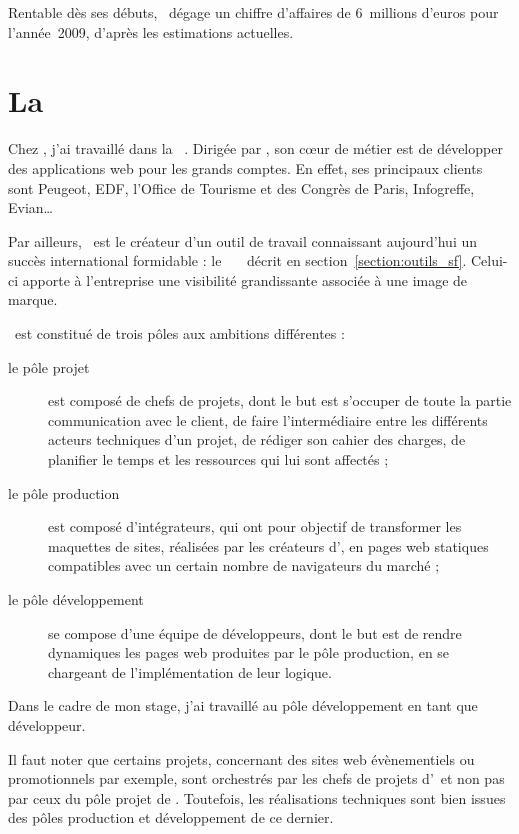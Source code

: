 Rentable dès ses débuts, \asensio\ dégage un chiffre d'affaires de 6~millions d'euros pour l'année~2009, d'après les estimations actuelles.


\section{La \abufull\ \asl}

Chez \asensio, j'ai travaillé dans la \abufull\ \asl. Dirigée par \apotencier, son cœur de métier est de développer des applications web pour les grands comptes. En effet, ses principaux clients sont Peugeot, EDF, l'Office de Tourisme et des Congrès de Paris, Infogreffe, Evian\dots

Par ailleurs, \asl\ est le créateur d'un outil de travail connaissant aujourd'hui un succès international formidable : le \afm\ \aphp\ \asf\ décrit en section~\ref{section:outils_sf}. Celui-ci apporte à l'entreprise une visibilité grandissante associée à une image de marque. 

\asl\ est constitué de trois pôles aux ambitions différentes :

\begin{description}
	\item[le pôle projet] est composé de chefs de projets, dont le but est s'occuper de toute la partie communication avec le client, de faire l'intermédiaire entre les différents acteurs techniques d'un projet, de rédiger son cahier des charges, de planifier le temps et les ressources qui lui sont affectés ;
	\item[le pôle production] est composé d'intégrateurs, qui ont pour objectif de transformer les maquettes de sites, réalisées par les créateurs d'\aes, en pages web statiques compatibles avec un certain nombre de navigateurs du marché ;
	\item[le pôle développement] se compose d'une équipe de développeurs, dont le but est de rendre dynamiques les pages web produites par le pôle production, en se chargeant de l'implémentation de leur logique.
\end{description}

Dans le cadre de mon stage, j'ai travaillé au pôle développement en tant que développeur.

Il faut noter que certains projets, concernant des sites web évènementiels ou promotionnels par exemple, sont orchestrés par les chefs de projets d'\aes\ et non pas par ceux du pôle projet de \asl. Toutefois, les réalisations techniques sont bien issues des pôles production et développement de ce dernier.


